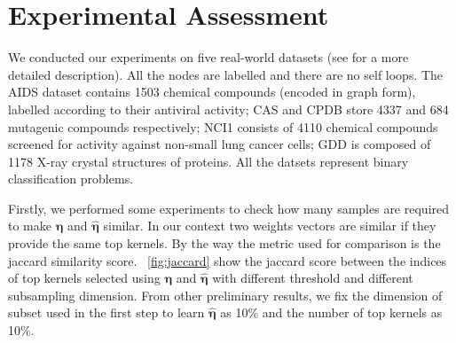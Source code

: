 \documentclass{esannV2}
\newcommand{\1}{{\bf 1}}
\begin{document}


\section{Experimental Assessment}
We conducted our experiments on five real-world datasets (see \cite{DaSanMartino2016} for a more detailed description).
All the nodes are labelled and there are no self loops.
The AIDS dataset contains 1503 chemical compounds (encoded in graph form), labelled according to
their antiviral activity; CAS and CPDB store 4337 and 684 mutagenic
compounds respectively; NCI1 consists of 4110 chemical compounds screened for activity against 
non-small lung cancer cells; GDD is composed of 1178 X-ray crystal structures of
proteins.
All the datsets represent binary classification problems.

Firstly, we performed some experiments to check how many samples are required to make $\boldsymbol{\eta}$ and $\hat{\boldsymbol{\eta}}$ similar.
In our context two weights vectors are similar if they provide the same top kernels. By the way the metric used for comparison is the jaccard similarity score. \figurename\ \ref{fig:jaccard} show the jaccard score between the indices of top kernels selected using $\boldsymbol{\eta}$ and $\hat{\boldsymbol{\eta}}$ with different threshold and different subsampling dimension.
From other preliminary results, we fix the dimension of subset used in the first step to learn $\hat{\boldsymbol{\eta}}$ as 10\% and the number of top kernels as 10\%.
\end{document}
